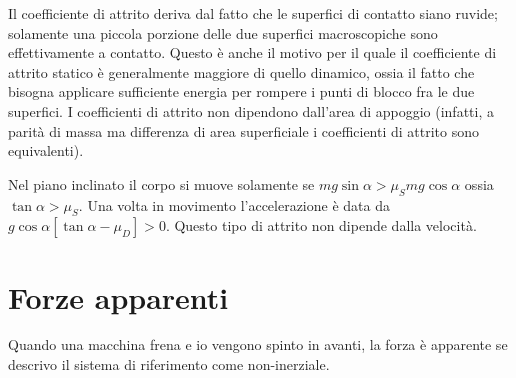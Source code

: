 \documentclass[a4paper]{article}
\begin{document}
Il coefficiente di attrito deriva dal fatto che le superfici di contatto siano
ruvide; solamente una piccola porzione delle due superfici macroscopiche sono effettivamente a contatto.
Questo è anche il motivo per il quale il coefficiente di attrito statico è generalmente maggiore
di quello dinamico, ossia il fatto che bisogna applicare sufficiente energia per rompere
i punti di blocco fra le due superfici. I coefficienti di attrito
non dipendono dall'area di appoggio (infatti, a parità di massa ma differenza di area
superficiale i coefficienti di attrito sono equivalenti).


Nel piano inclinato il corpo si muove solamente se \(mg\sin\alpha > \mu_S mg\cos\alpha\)
ossia \(\tan \alpha > \mu_S\).
Una volta in movimento l'accelerazione è data da \(g\cos\alpha\left[\tan\alpha-\mu_D\right]>0\).
Questo tipo di attrito non dipende dalla velocità.

\pagebreak

\section{Forze apparenti}

%
%
Quando una macchina frena e io vengono spinto in avanti, la forza è apparente
se descrivo il sistema di riferimento come non-inerziale.
\end{document}
